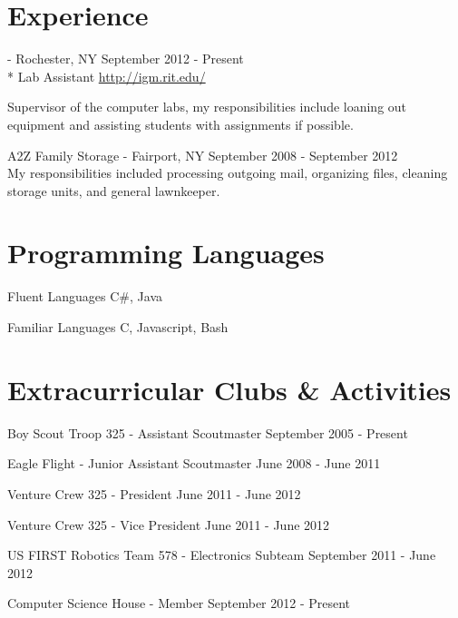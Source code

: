\documentclass[letterpaper,margin,line,11pt]{resume}
\newcommand{\rurl}[1]{\hfill {\footnotesize \url{#1}}}
\newcommand{\rdate}[1]{\hfill {\small #1}}
\renewcommand{\employer}[5]{\item[#1] - #2 \rdate{#3} \\* #4 \rurl{#5}}
\begin{document}
\begin{resume}
\section{\mysidestyle Experience}
	\begin{asparadesc}
		\employer{Interactive Games and Media at RIT}{Rochester, NY}{September 2012 - Present}{Lab Assistant}{http://igm.rit.edu/}

		\small
		Supervisor of the computer labs, my responsibilities include loaning out equipment and assisting students with assignments if possible.
		\normalsize
		\\
		\item[A2Z Family Storage] - Fairport, NY \hfill September 2008 - September 2012 \\
		\small
                My responsibilities included processing outgoing mail, organizing files, cleaning storage units, and general lawnkeeper.
		

	\end{asparadesc}

\section{\mysidestyle Programming Languages}
	\begin{compactdesc}
		\item[Fluent Languages] C\#, Java 
		\item[Familiar Languages] C, Javascript, Bash\\
	\end{compactdesc}

\section{\mysidestyle Extracurricular Clubs \& Activities}
	\begin{asparablank}
		\item Boy Scout Troop 325 - {\small Assistant Scoutmaster} \hfill September 2005 - Present
		\item Eagle Flight - {\small Junior Assistant Scoutmaster} \hfill June 2008 - June 2011
		\item Venture Crew 325 - {\small President} \hfill June 2011 - June 2012
		\item Venture Crew 325 - {\small Vice President} \hfill June 2011 - June 2012
		\item US FIRST Robotics Team 578 - {\small Electronics Subteam} \hfill September 2011 - June 2012
		\item Computer Science House - Member \hfill September 2012 - Present
	\end{asparablank}


\end{resume}
\end{document}
